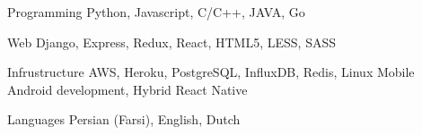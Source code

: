 

\begin{cvskills}

  \cvskill
    {Programming} %
    {Python, Javascript, C/C++, JAVA, Go} %

  \cvskill
    {Web} %
    {Django, Express, Redux, React, HTML5, LESS, SASS} %

  \cvskill
    {Infrustructure}
    {AWS, Heroku, PostgreSQL, InfluxDB, Redis, Linux}
  \cvskill
    {Mobile} %
    {Android development, Hybrid React Native} %

  \cvskill
    {Languages} %
    {Persian (Farsi), English, Dutch} %

\end{cvskills}
